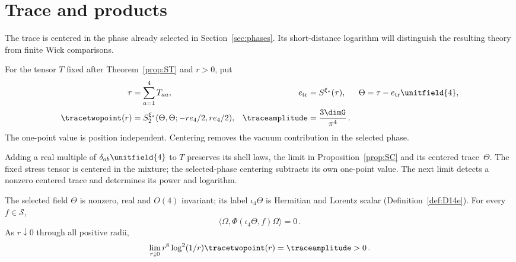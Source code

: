 \section{Trace and products}\label{sec:trace-products}

The trace is centered in the phase already selected in Section~\ref{sec:phases}. Its short-distance logarithm will distinguish the resulting theory from finite Wick comparisons.

\begin{definition}\label{def:D16}
For the tensor $T$ fixed after Theorem~\ref{prop:ST} and $r>0$, put
\begin{align*}
\tau&=\sum_{a=1}^4T_{aa},&e_{\rm tr}&=S^{\xi_*}(\tau),&\Theta&=\tau-e_{\rm tr}\unitfield{4},\\
\tracetwopoint(r)&=S_2^{\xi_*}(\Theta,\Theta;-re_4/2,re_4/2),&\traceamplitude&=\frac{3\dimG}{\pi^4}\,.
\end{align*}
The one-point value is position independent. Centering removes the vacuum contribution in the selected phase.
\end{definition}

Adding a real multiple of $\delta_{ab}\unitfield{4}$ to $T$ preserves its shell laws, the limit in Proposition~\ref{prop:SC} and its centered trace~$\Theta$. The fixed stress tensor is centered in the mixture; the selected-phase centering subtracts its own one-point value. The next limit detects a nonzero centered trace and determines its power and logarithm.

\begin{theorem}\label{prop:TR}
The selected field $\Theta$ is nonzero, real and $O(4)$ invariant; its label $\iota_4\Theta$ is Hermitian and Lorentz scalar (Definition~\ref{def:D14e}). For every $f\in\mathcal S$,
\begin{equation*}
\langle\Omega,\Phi(\iota_4\Theta,f)\Omega\rangle=0\,.
\end{equation*}
As $r\downarrow0$ through all positive radii,
\begin{equation*}
\lim_{r\downarrow0}r^8\log^2(1/r)\tracetwopoint(r)=\traceamplitude>0\,.
\end{equation*}
\end{theorem}

